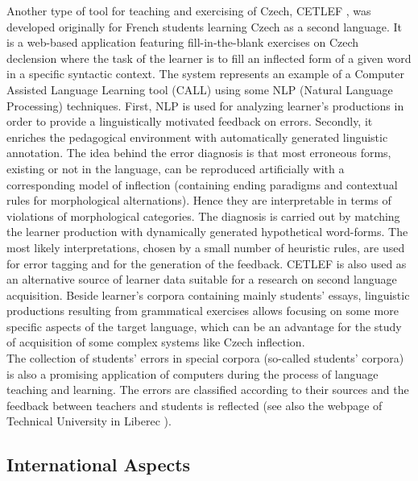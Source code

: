 \begin{multicols}{2}
Another type of tool for teaching and exercising of Czech, CETLEF \cite{Note9en}, was developed originally for French students learning Czech as a second language. It is a web-based application featuring fill-in-the-blank exercises on Czech declension where the task of the learner is to fill an inflected form of a given word in a specific syntactic context. The system represents an example of a Computer Assisted Language Learning tool (CALL) using some NLP (Natural Language Processing) techniques. First, NLP is used for analyzing learner’s productions in order to provide a linguistically motivated feedback on errors. Secondly, it enriches the pedagogical environment with automatically generated linguistic annotation. The idea behind the error diagnosis is that most erroneous forms, existing or not in the language, can be reproduced artificially with a corresponding model of inflection (containing ending paradigms and contextual rules for morphological alternations). Hence they are interpretable in terms of violations of morphological categories. The diagnosis is carried out by matching the learner production with dynamically generated hypothetical word-forms. The most likely interpretations, chosen by a small number of heuristic rules, are used for error tagging and for the generation of the feedback. CETLEF is also used as an alternative source of learner data suitable for a research on second language acquisition. Beside learner’s corpora containing mainly students’ essays, linguistic productions resulting from grammatical exercises allows focusing on some more specific aspects of the target language, which can be an advantage for the study of acquisition of some complex systems like Czech inflection.\\
The collection of students’ errors in special corpora (so-called students’ corpora) is also a promising application of computers during the process of language teaching and learning. The errors are classified according to their sources and the feedback between teachers and students is reflected (see also the webpage of Technical University in Liberec \cite{Note10}).

\subsection{International Aspects}


\end{multicols}
